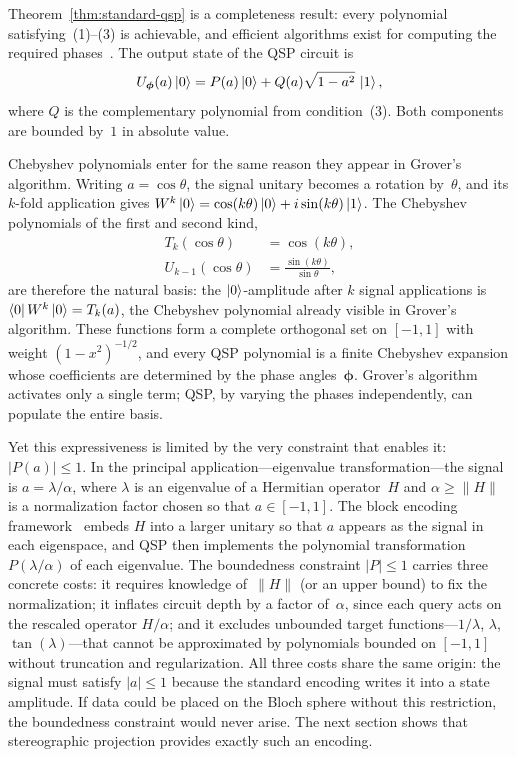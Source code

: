 Theorem~\ref{thm:standard-qsp} is a completeness
result: every polynomial satisfying~(1)--(3) is
achievable, and efficient algorithms exist for
computing the required
phases~\cite{DongMengWhaleyEtAl2021,Haah2019}.
The output state of the QSP circuit is
\begin{equation}
	U_{\bm{\phi}}(a)\ket{0}
	= P(a)\ket{0} + Q(a)\sqrt{1-a^2}\,\ket{1},
	\label{eq:qsp-output-state}
\end{equation}
where $Q$ is the complementary polynomial from
condition~(3).  Both components are bounded by~$1$
in absolute value.

Chebyshev polynomials enter for the same reason they
appear in Grover's algorithm.  Writing
$a = \cos\theta$, the signal unitary becomes a rotation
by~$\theta$, and its $k$-fold application gives
$W^k\ket{0} = \cos(k\theta)\ket{0} +
	i\sin(k\theta)\ket{1}$.  The Chebyshev polynomials of
the first and second kind,
\begin{align}
	T_k(\cos\theta)     & = \cos(k\theta),
	\label{eq:cheby-T-def}                                    \\
	U_{k-1}(\cos\theta) & = \frac{\sin(k\theta)}{\sin\theta},
	\label{eq:cheby-U-def}
\end{align}
are therefore the natural basis: the
$\ket{0}$-amplitude after $k$ signal applications is
$\bra{0}W^k\ket{0} = T_k(a)$, the Chebyshev
polynomial already visible in Grover's algorithm.
These functions form a complete orthogonal set on
$[-1,1]$ with weight $(1-x^2)^{-1/2}$, and every QSP
polynomial is a finite Chebyshev expansion whose
coefficients are determined by the phase
angles~$\bm{\phi}$.  Grover's algorithm activates only
a single term; QSP, by varying the phases
independently, can populate the entire basis.

Yet this expressiveness is limited by the very
constraint that enables it: $|P(a)| \leq 1$.  In the
principal application---eigenvalue
transformation---the signal is
$a = \lambda/\alpha$, where $\lambda$ is an eigenvalue
of a Hermitian operator~$H$ and
$\alpha \geq \|H\|$ is a normalization factor chosen
so that $a \in [-1,1]$.  The block encoding
framework~\cite{GSLW2019} embeds $H$ into a larger
unitary so that $a$ appears as the signal in each
eigenspace, and QSP then implements the polynomial
transformation $P(\lambda/\alpha)$ of each eigenvalue.
The boundedness constraint $|P| \leq 1$ carries three
concrete costs: it requires knowledge of~$\|H\|$ (or
an upper bound) to fix the normalization; it inflates
circuit depth by a factor of~$\alpha$, since each
query acts on the rescaled operator $H/\alpha$; and it
excludes unbounded target functions---$1/\lambda$,
$\lambda$, $\tan(\lambda)$---that cannot be
approximated by polynomials bounded on $[-1,1]$
without truncation and regularization.  All three
costs share the same origin: the signal must satisfy
$|a| \leq 1$ because the standard encoding writes it
into a state amplitude.  If data could be placed on
the Bloch sphere without this restriction, the
boundedness constraint would never arise.  The next
section shows that stereographic projection provides
exactly such an encoding.

